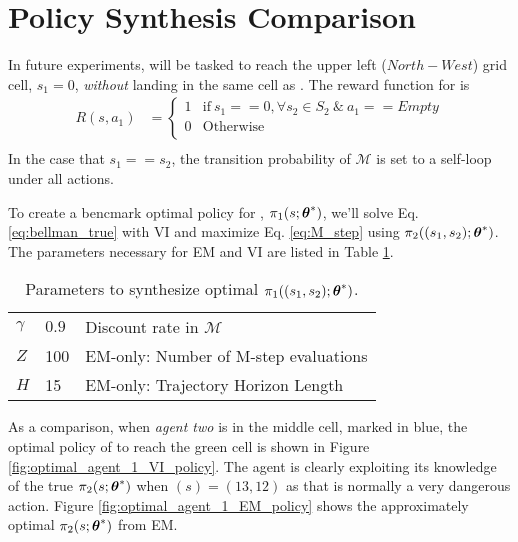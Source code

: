 \section{Policy Synthesis Comparison} \label{sec:em_vi_comparison}
In future experiments,  will be tasked to reach the upper left ($North-West$) grid cell, $s_1=0$,
\emph{without} landing in the same cell as . The reward function for  is
\begin{align*}
        R(s,a_1) & = \begin{cases}
1 & \text{if}\ s_1 == 0, \forall s_2 \in S_2\ \&\ a_1==Empty \\
0 & \text{Otherwise} \\
\end{cases} \\
\end{align*}
In the case that $s_1==s_2$, the transition probability of $\mathcal{M}$ is set to a self-loop under all actions.

To create a bencmark optimal policy for , $\pi_{1}(s;\boldsymbol{\mathbb{\theta}}^*)$, we'll solve Eq.
\ref{eq:bellman_true} with \ac{VI} and maximize Eq. \ref{eq:M_step} using $\pi_{2}((s_1,s_2);\boldsymbol{\mathbb{\theta}}^*)$.
The parameters necessary for EM and VI are listed in Table \ref{table:optimal_agent_1_EM_policy_params}.

\begin{table}[H]
        \centering
        \begin{tabular}{l|l l}
                $\gamma$ & $0.9$ & Discount rate in $\mathcal{M}$ \\
                $Z$ & 100 & EM-only: Number of M-step evaluations \\
                $H$ & 15 & EM-only: Trajectory Horizon Length \\
        \end{tabular}
        \caption{Parameters to synthesize optimal $\pi_{1}((s_1,s_2);\boldsymbol{\mathbb{\theta}}^*)$.}
        \label{table:optimal_agent_1_EM_policy_params}
\end{table}
As a comparison, when \emph{agent two} is in the middle cell, marked in blue, the optimal policy of  to reach
the green cell is shown in Figure \ref{fig:optimal_agent_1_VI_policy}. The agent is clearly exploiting its knowledge of
the true $\pi_{2}(s;\boldsymbol{\mathbb{\theta}}^*)$ when $(s) = (13,12)$ as that is normally a very dangerous action. Figure
\ref{fig:optimal_agent_1_EM_policy} shows the approximately optimal $\pi_{2}(s;\boldsymbol{\mathbb{\theta}}^*)$ from EM.

